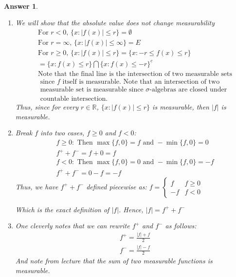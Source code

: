 \documentclass[12pt]{article}
\theoremstyle{colon}
\newtheorem*{answer}{Answer}
\begin{document}
\begin{answer}
  \leavevmode
  \begin{enumerate}[label=(\roman*)]
    \item We will show that the absolute value does not change measurability
      \begin{align*}
        &\text{For $r < 0$, } \{ x: |f(x)| \leq r\} = \emptyset \\
        &\text{For $r = \infty$, }\{ x: |f(x)| \leq \infty\} = E \\
        &\text{For $r \geq 0$, } \{ x: |f(x)| \leq r\} = \{ x: -r \leq f(x) \leq r\} \\
        &= \{ x: f(x) \leq r\} \bigcap \{ x: f(x) \leq -r\}^c \\
        &\text{Note that the final line is the intersection of two measurable sets} \\
        &\text{ since $f$ itself is measurable. Note that an intersection of two } \\
        &\text{ measurable set is measurable since $\sigma$-algebras are closed under } \\
        &\text{ countable intersection.}
      \end{align*}
      Thus, since for every $r \in \mathbb{R}$, $\{ x: |f(x)| \leq r\}$ is measurable, then $|f|$ is measurable.
    \item Break $f$ into two cases, $f \geq 0$ and $f < 0$:
      \begin{align*}
        &f \geq 0: \text{ Then } \max\{f, 0\} = f \text{ and } -\min\{f,0\} = 0 \\
        &f^+ + f^- = f + 0 = f \\
        &f < 0: \text{ Then } \max\{f, 0\} = 0 \text{ and } -\min\{f,0\} = -f \\
        &f^+ + f^- = 0 - f = -f
      \end{align*}
      Thus, we have $f^+ + f^-$ defined piecewise as:
      $
      f = \begin{cases}
          f & f \geq 0 \\
          -f & f < 0
      \end{cases}
      $
      \par
      Which is the exact definition of $|f|$. Hence, $|f| = f^+ + f^-$
    \item One cleverly notes that we can rewrite $f^+$ and $f^-$ as follows:
      \begin{align*}
        &f^+ = \frac{|f| + f}{2} \\
        &f^- = \frac{|f| - f}{2}
      \end{align*}
      And note from lecture that the sum of two measurable functions is measurable.
  \end{enumerate}
\end{answer}
\end{document}
